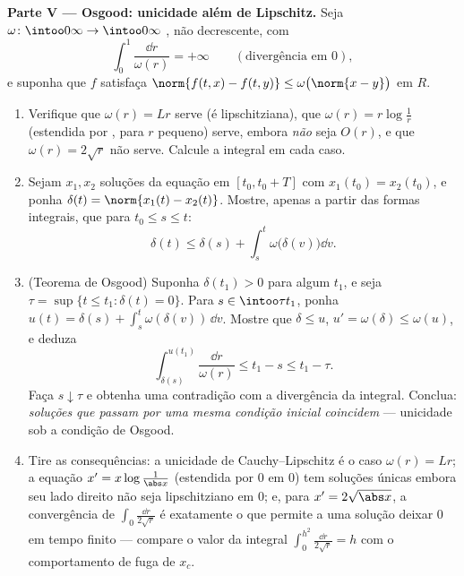 \begin{problem}[{Problema de fim de semana --- existência de soluções
de $x' = f(t, x)$ sem Lipschitz}]
\medskip
\noindent\textbf{Parte V --- Osgood: unicidade além de Lipschitz.}
Seja $\omega\colon\intoo0\infty\to\intoo0\infty$ , não decrescente, com
\[
\int_0^1\frac{\dd r}{\omega(r)} = +\infty
\qquad(\text{divergência em } 0),
\]
e suponha que $f$ satisfaça $\norm{f(t, x) - f(t, y)} \leq
\omega\bigl(\norm{x - y}\bigr)$ em $R$.
\begin{enumerate}[resume]
  \item Verifique que $\omega(r) = Lr$ serve (é lipschitziana), que $\omega(r) = r\log\frac1r$
        (estendida por , para $r$ pequeno) serve, embora
        \emph{não} seja $O(r)$, e que $\omega(r) = 2\sqrt r$ não serve. Calcule a
        integral em cada caso.
  \item Sejam $x_1, x_2$ soluções da equação em $[t_0, t_0 + T]$ com $x_1(t_0) = x_2(t_0)$, e ponha
        $\delta(t) =
        \norm{x_1(t) - x_2(t)}$. Mostre, apenas a partir das formas integrais, que para
        $t_0 \leq s \leq t$:
        \[
        \delta(t) \leq \delta(s) +
        \int_s^t\omega\bigl(\delta(v)\bigr)\dd v .
        \]
  \item (Teorema de Osgood) Suponha $\delta(t_1) > 0$ para algum $t_1$, e seja
        $\tau = \sup\{t \leq t_1 : \delta(t) =
        0\}$. Para $s \in \intoo\tau{t_1}$, ponha $u(t) = \delta(s)
        + \int_s^t\omega(\delta(v))\,\dd v$. Mostre que $\delta \leq
        u$, $u' = \omega(\delta) \leq \omega(u)$, e deduza
        \[
        \int_{\delta(s)}^{u(t_1)}\frac{\dd r}{\omega(r)}
        \leq t_1 - s \leq t_1 - \tau .
        \]
        Faça $s \downarrow \tau$ e obtenha uma contradição com a divergência da
        integral. Conclua: \emph{soluções que passam por uma mesma
        condição inicial coincidem} --- unicidade sob a condição de
        Osgood.
  \item Tire as consequências: a unicidade de Cauchy--Lipschitz é o
        caso $\omega(r) = Lr$; a equação $x' =
        x\log\frac1{\abs x}$ (estendida por $0$ em $0$)
        tem soluções únicas embora seu lado direito não seja
        lipschitziano em $0$; e, para $x' = 2\sqrt{\abs x}$, a convergência de $\int_0\frac{\dd r}{2\sqrt r}$
        é exatamente o que permite a uma solução deixar $0$ em tempo
        finito --- compare o valor da integral $\int_0^{h^2}\frac{\dd r}{2\sqrt r} = h$ com o comportamento
        de fuga de $x_c$.
\end{enumerate}


\end{problem}
